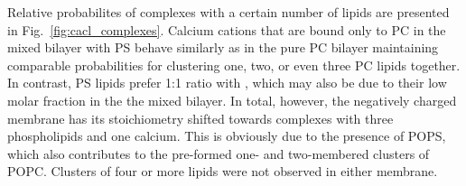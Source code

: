 Relative probabilites of  complexes with a certain number of lipids are presented in Fig.~\ref{fig:cacl_complexes}. 
Calcium cations that are bound only to PC in the mixed bilayer with PS 
behave similarly as in the pure PC bilayer
maintaining comparable probabilities for clustering one, two, or even three PC lipids together. 
In contrast, PS lipids prefer 1:1 ratio with ,
which may also be due to their low molar fraction in the the mixed bilayer. 
In total, however, the negatively charged membrane has its stoichiometry 
shifted towards complexes with three phospholipids and one calcium. 
This is obviously due to the presence of POPS, 
which also contributes to the pre-formed one- and two-membered clusters of POPC. 
Clusters of four or more lipids were not observed in either membrane. 










 
 
 









